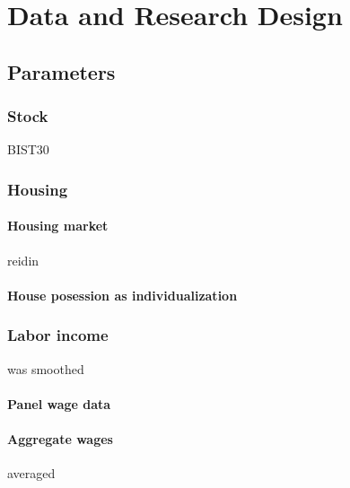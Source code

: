 \chapter{Data and Research Design}
\label{data}

\section{Parameters}
\subsection{Stock}
BIST30
\subsection{Housing}
\subsubsection{Housing market}
reidin
\subsubsection{House posession as individualization}
\subsection{Labor income}
was smoothed
\subsubsection{Panel wage data}
\subsubsection{Aggregate wages}
averaged
